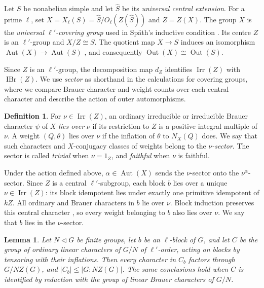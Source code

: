 \documentclass[10pt]{amsart}
\newtheorem{lemma}[theorem]{Lemma}
\theoremstyle{definition}
\newtheorem{definition}[theorem]{Definition}
\renewcommand{\leq}{\leqslant}
\DeclareMathOperator{\Aut}{Aut}
\DeclareMathOperator{\Out}{Out}
\DeclareMathOperator{\IBr}{IBr}
\DeclareMathOperator{\Irr}{Irr}
\numberwithin{equation}{section}
\numberwithin{table}{section}
\begin{document}
Let $S$ be nonabelian simple and let $\widehat S$ be its
\emph{universal central extension}.  For a prime $\ell$, set
$X=X_\ell(S)=\widehat S/O_\ell(Z(\widehat S))$ and $Z=Z(X)$.
The group $X$ is the \emph{universal $\ell'$-covering group} used in
Sp\"ath's inductive condition \cite[Definition~4.1]{Spath2013}.  Its centre
$Z$ is an $\ell'$-group and $X/Z\cong S$.  The quotient map
$X\longrightarrow S$ induces an isomorphism
$\Aut(X)\longrightarrow\Aut(S)$ \cite[p.~184]{Spath2013}, and
consequently $\Out(X)\cong\Out(S)$.

Since $Z$ is an $\ell'$-group, the decomposition map $d_Z$ identifies
$\Irr(Z)$ with $\IBr(Z)$. We use \emph{sector} as shorthand in the calculations for covering groups,
where we compare Brauer character and weight counts over each central
character and describe the action of outer automorphisms.

\begin{definition}\label{def:central-sector}
For $\nu\in\Irr(Z)$, an ordinary irreducible or irreducible Brauer character
$\psi$ of $X$ \emph{lies over} $\nu$ if its restriction to $Z$ is a positive
integral multiple of $\nu$. A weight $(Q,\theta)$ lies over $\nu$ if the
inflation of $\theta$ to $N_X(Q)$ does. We say that such characters and
$X$-conjugacy classes of weights belong to the \emph{$\nu$-sector}. The sector
is called \emph{trivial} when $\nu=1_Z$, and \emph{faithful} when $\nu$ is
faithful.
\end{definition}

Under the action defined above, $\alpha\in\Aut(X)$ sends the $\nu$-sector onto
the $\nu^\alpha$-sector. Since $Z$ is a central $\ell'$-subgroup,
each block $b$ lies over a unique $\nu\in\Irr(Z)$: its block idempotent
lies under exactly one primitive idempotent of $kZ$.
All ordinary and Brauer characters in $b$ lie over $\nu$.
Block induction preserves this central character
\cite[Definition~2.1]{Spath2013}, so every weight belonging to $b$
also lies over $\nu$. We say that $b$ lies in the $\nu$-sector.

\begin{lemma}\label{lem:linear-block-stabilizer}
Let $N\lhd G$ be finite groups, let $b$ be an $\ell$-block of $G$,
and let $C$ be the group of ordinary linear characters of $G/N$
of $\ell'$-order, acting on blocks by tensoring with their inflations.
Then every character in $C_b$ factors through $G/NZ(G)$, and
$|C_b|\leq |G:NZ(G)|$. The same conclusions hold when $C$ is
identified by reduction with the group of linear Brauer characters of $G/N$.
\end{lemma}
\end{document}
